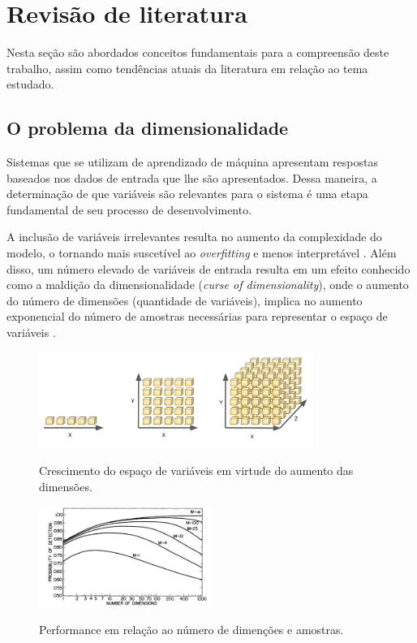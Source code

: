\chapter[Revisão de literatura ]{Revisão de literatura}

Nesta seção são abordados conceitos fundamentais para a compreensão deste trabalho, assim como tendências atuais da literatura em relação ao tema estudado.

\section{O problema da dimensionalidade}

Sistemas que se utilizam de aprendizado de máquina apresentam respostas baseados nos dados de entrada que lhe são apresentados. Dessa maneira, a determinação de que variáveis são relevantes para o sistema é uma etapa fundamental de seu processo de desenvolvimento.

A inclusão de variáveis irrelevantes resulta no aumento da complexidade do modelo, o tornando mais suscetível ao \textit{overfitting} e menos interpretável \cite[p. 204]{intro_stat_learn}. Além disso, um número elevado de variáveis de entrada resulta em um efeito conhecido como a maldição da dimensionalidade (\textit{curse of dimensionality}), onde o aumento do número de dimensões (quantidade de variáveis), implica no aumento exponencial do número de amostras necessárias para representar o espaço de variáveis \cite[p. 34]{bishop_2006}.

\begin{figure}[H]
    \centering
    \caption{Crescimento do espaço de variáveis em virtude do aumento das dimensões.}
    \includegraphics[width=0.8\textwidth]{imgs/rev/dimensionalty_grown.png}
    \label{fig:dim_grown}
\end{figure}

\begin{figure}[H]
    \centering
    \caption{Performance em relação ao número de dimenções e amostras.}
    \includegraphics[width=0.5\textwidth]{imgs/rev/dim_performance}
    \label{fig:dim_perf}
\end{figure}


